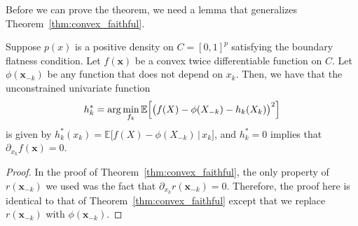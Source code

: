Before we can prove the theorem, we need a lemma that generalizes Theorem~\ref{thm:convex_faithful}.

\begin{lemma}
\label{cor:faithfulness_extension}
Suppose $p(x)$ is a positive density on $C=[0,1]^p$ satisfying the boundary flatness condition.
Let $f(\mathbf{x})$ be a convex twice differentiable function on $C$. Let $\phi(\mathbf{x}_{-k})$ be any function that does not depend on $x_k$. Then, we have that the unconstrained univariate function
 \begin{align}
h^*_k = \arg\min_{f_k} \mathbb{E} \Bigl[\bigl( f(X) 
           - \phi(X_{-k}) - h_k(X_k) \bigr)^2\Bigr]
\end{align}
is given by $h^*_k(x_k) = \mathbb{E}\bigl[ f(X) - \phi(X_{-k}) \,|\, x_k\bigr]$,
and $ h^*_k = 0$ implies that $\partial_{x_k} f(\mathbf{x}) = 0$.
\end{lemma}

\begin{proof}
  In the proof of Theorem~\ref{thm:convex_faithful}, the only property
  of $r(\mathbf{x}_{-k})$ we used was the fact that $\partial_{x_k}
  r(\mathbf{x}_{-k}) = 0$. Therefore, the proof here is identical to
  that of Theorem~\ref{thm:convex_faithful} except that we replace $r(\mathbf{x}_{-k})$ with $\phi(\mathbf{x}_{-k})$.
\end{proof}


